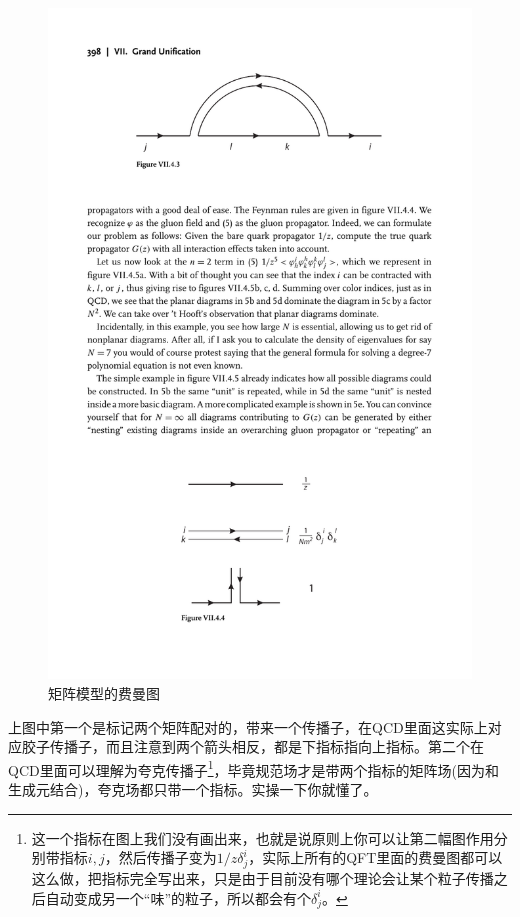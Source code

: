 \begin{figure}[H]
	\centering
	\includegraphics{figs/fig6.pdf}
	\caption{矩阵模型的费曼图}
\end{figure}
上图中第一个是标记两个矩阵配对的，带来一个传播子，在QCD里面这实际上对应胶子传播子，而且注意到两个箭头相反，都是下指标指向上指标。第二个在QCD里面可以理解为夸克传播子\footnote{这一个指标在图上我们没有画出来，也就是说原则上你可以让第二幅图作用分别带指标$i,j$，然后传播子变为$1/z\delta^i_j$，实际上所有的QFT里面的费曼图都可以这么做，把指标完全写出来，只是由于目前没有哪个理论会让某个粒子传播之后自动变成另一个“味”的粒子，所以都会有个$\delta^i_j$。}，毕竟规范场才是带两个指标的矩阵场(因为和生成元结合)，夸克场都只带一个指标。实操一下你就懂了。

